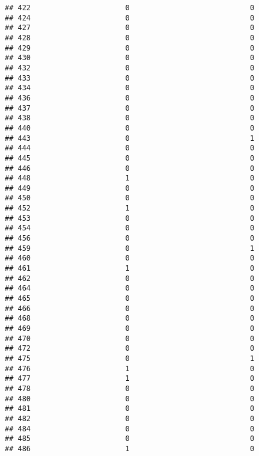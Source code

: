 \documentclass[
]{article}
\begin{document}
\begin{verbatim}
## 422                      0                            0
## 424                      0                            0
## 427                      0                            0
## 428                      0                            0
## 429                      0                            0
## 430                      0                            0
## 432                      0                            0
## 433                      0                            0
## 434                      0                            0
## 436                      0                            0
## 437                      0                            0
## 438                      0                            0
## 440                      0                            0
## 443                      0                            1
## 444                      0                            0
## 445                      0                            0
## 446                      0                            0
## 448                      1                            0
## 449                      0                            0
## 450                      0                            0
## 452                      1                            0
## 453                      0                            0
## 454                      0                            0
## 456                      0                            0
## 459                      0                            1
## 460                      0                            0
## 461                      1                            0
## 462                      0                            0
## 464                      0                            0
## 465                      0                            0
## 466                      0                            0
## 468                      0                            0
## 469                      0                            0
## 470                      0                            0
## 472                      0                            0
## 475                      0                            1
## 476                      1                            0
## 477                      1                            0
## 478                      0                            0
## 480                      0                            0
## 481                      0                            0
## 482                      0                            0
## 484                      0                            0
## 485                      0                            0
## 486                      1                            0

\end{verbatim}
\end{document}
